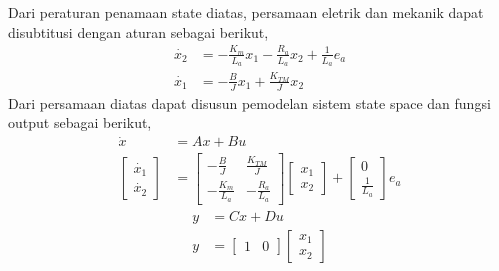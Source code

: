 \documentclass[../main.tex]{subfiles}
\begin{document}
                Dari peraturan penamaan state diatas, persamaan eletrik dan mekanik dapat disubtitusi dengan aturan sebagai berikut,
                \begin{equation}
                    \begin{split}
                        \dot{x_2} &= -\frac{K_m}{L_a}x_1 - \frac{R_a}{L_a}x_2 + \frac{1}{L_a}e_a \\[5pt]
                        \dot{x_1} &= -\frac{B}{J}x_1 + \frac{K_{TM}}{J}x_2
                    \end{split}
                \end{equation}
                Dari persamaan diatas dapat disusun pemodelan sistem state space dan fungsi output sebagai berikut,
                \begin{equation}
                    \begin{split}
                        \dot{x} &= Ax + Bu \\[5pt]
                        \begin{bmatrix} \dot{x_1} \\ \dot{x_2} \end{bmatrix} &= \begin{bmatrix} -\frac{B}{J} & \frac{K_{TM}}{J} \\ -\frac{K_m}{L_a} & -\frac{R_a}{L_a} \end{bmatrix} \begin{bmatrix}
                        x_1 \\ x_2 \end{bmatrix} + \begin{bmatrix}
                        0 \\ \frac{1}{L_a}\end{bmatrix}e_a
                    \end{split}
                \end{equation}
                \begin{equation}
                    \begin{split}
                        y &= Cx + Du \\[5pt]
                        y &= \begin{bmatrix} 1 & 0 \end{bmatrix} \begin{bmatrix} x_1 \\ x_2 \end{bmatrix}
                    \end{split}
                \end{equation}
\end{document}
